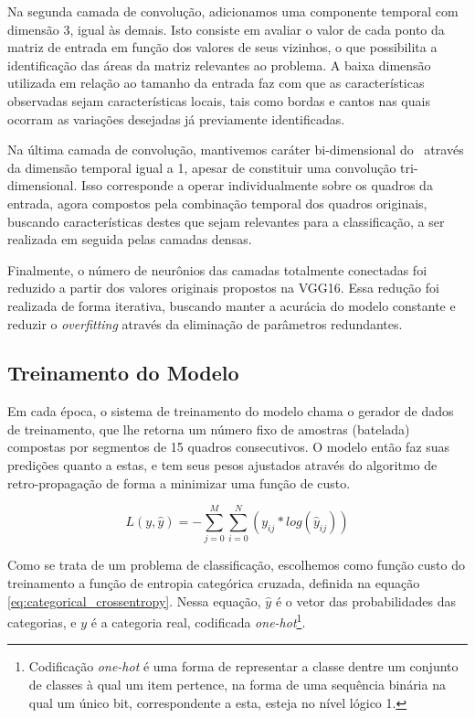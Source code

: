Na segunda camada de convolução, adicionamos uma componente temporal com dimensão 3, igual às demais.
Isto consiste em avaliar o valor de cada ponto da matriz de entrada em função dos valores de seus vizinhos, o que possibilita a identificação das áreas da matriz relevantes ao problema.
A baixa dimensão utilizada em relação ao tamanho da entrada faz com que as características observadas sejam características locais, tais como bordas e cantos nas quais ocorram as variações desejadas já previamente identificadas.

Na última camada de convolução, mantivemos caráter bi-dimensional do \ através da dimensão temporal igual a 1, apesar de constituir uma convolução tri-dimensional.
Isso corresponde a operar individualmente sobre os quadros da entrada, agora compostos pela combinação temporal dos quadros originais, buscando características destes que sejam relevantes para a classificação, a ser realizada em seguida pelas camadas densas.

Finalmente, o número de neurônios das camadas totalmente conectadas foi reduzido a partir dos valores originais propostos na VGG16.
Essa redução foi realizada de forma iterativa, buscando manter a acurácia do modelo constante e reduzir o \textit{overfitting} através da eliminação de parâmetros redundantes.

\subsection{Treinamento do Modelo}
\label{sec:train-flow}

Em cada época, o sistema de treinamento do modelo chama o gerador de dados de treinamento, que lhe retorna um número fixo de amostras (batelada) compostas por segmentos de 15 quadros consecutivos.
O modelo então faz suas predições quanto a estas, e tem seus pesos ajustados através do algoritmo de retro-propagação de forma a minimizar uma função de custo.

\begin{equation} \label{eq:categorical_crossentropy}
    L(y,\hat{y})=-\sum\limits_{j=0}^M\sum\limits_{i=0}^N(y_{ij}*log(\hat{y}_{ij}))
\end{equation}

Como se trata de um problema de classificação, escolhemos como função custo do treinamento a função de entropia categórica cruzada, definida na equação \ref{eq:categorical_crossentropy}. Nessa equação, $\hat{y}$ é o vetor das probabilidades das categorias, e $y$ é a categoria real, codificada \textit{one-hot}\footnote{Codificação \textit{one-hot} é uma forma de representar a classe dentre um conjunto de classes à qual um item pertence, na forma de uma sequência binária na qual um único bit, correspondente a esta, esteja no nível lógico 1.}.

